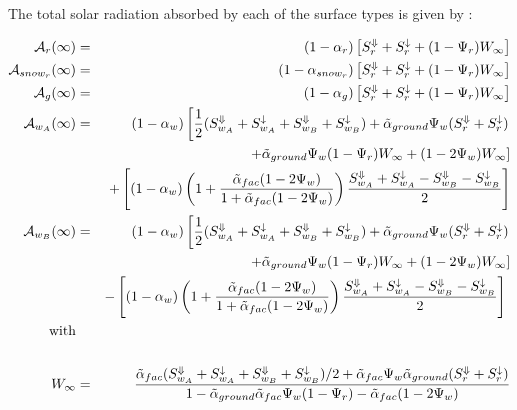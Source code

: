 The total solar radiation absorbed by each of the surface types is given by :

{\footnotesize
\begin{eqnarray}
\mathcal{A}_r(\infty)     & = & (1-\alpha_r)\left[S^\Downarrow_r + S^\downarrow_r+ (1-\Psi_r)W_\infty\right] \nonumber\\
	\mathcal{A}_{snow_r}(\infty)  & = & (1-\alpha_{snow_r})\left[S^\Downarrow_r +S^\downarrow_r + (1-\Psi_r)W_\infty\right] \nonumber\\
\mathcal{A}_g(\infty)     & = & (1-\alpha_g)\left[S^\Downarrow_r +S^\downarrow_r + (1-\Psi_r)W_\infty\right] \nonumber\\
	\mathcal{A}_{w_A}(\infty) & = & (1-\alpha_w)\left[\frac{{1}}{{2}}(S^\Downarrow_{w_A}+S^\downarrow_{w_A}+S^\Downarrow_{w_B}+S^\downarrow_{w_B}) + \tilde{\alpha}_{ground}\Psi_w  (S^\Downarrow_r+S^\downarrow_r) \right. \nonumber\\
		&   & \left. + \tilde{\alpha}_{ground}\Psi_w(1-\Psi_r) W_\infty + (1-2\Psi_w) W_\infty \right]                                                   \nonumber\\
		&   & + \left[(1-\alpha_w)\left(1+\frac{\tilde{\alpha}_{fac}(1-2\Psi_w)}{1 + \tilde{\alpha}_{fac}(1-2\Psi_w)}\right)  \frac{S^\Downarrow_{w_A}+S^\downarrow_{w_A}-S^\Downarrow_{w_B}-S^\downarrow_{w_B}}{2}\right] \nonumber\\
	\mathcal{A}_{w_B}(\infty) & = & (1-\alpha_w)\left[\frac{{1}}{{2}}(S^\Downarrow_{w_A}+S^\downarrow_{w_A}+S^\Downarrow_{w_B}+S^\downarrow_{w_B}) + {\tilde{\alpha}_{ground}}\Psi_w  (S^\Downarrow_r+S^\downarrow_r) \right. \nonumber\\
		&   & \left. + \tilde{\alpha}_{ground}\Psi_w(1-\Psi_r) W_\infty + (1-2\Psi_w) W_\infty \right]                                                   \nonumber\\
      &   & - \left[(1-\alpha_w)\left(1+\frac{\tilde{\alpha}_{fac}(1-2\Psi_w)}{1 + \tilde{\alpha}_{fac}(1-2\Psi_w)}\right)  \frac{S^\Downarrow_{w_A}+S^\downarrow_{w_A}-S^\Downarrow_{w_B}-S^\downarrow_{w_B}}{2}\right] \nonumber\
\nonumber \\
{\rm with} \nonumber \\
\nonumber \\
W_\infty &=& \frac{\tilde{\alpha}_{fac}(S^\Downarrow_{w_A}+S^\downarrow_{w_A}+S^\Downarrow_{w_B}+S^\downarrow_{w_B})/2 + \tilde{\alpha}_{fac}\Psi_w\tilde{\alpha}_{ground}(S^\Downarrow_r+S^\downarrow_r)}
{1 - \tilde{\alpha}_{ground}\tilde{\alpha}_{fac}\Psi_w(1-\Psi_r) - \tilde{\alpha}_{fac}(1-2\Psi_w)} \nonumber  
\end{eqnarray}
}

